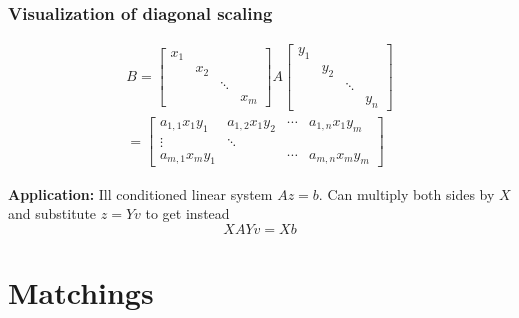 \documentclass{beamer}
\begin{document}
\begin{frame}
  \frametitle{Visualization of diagonal scaling}

  \begin{equation}
    \begin{aligned}
    B = \begin{bmatrix}
      x_1 & & & \\
      & x_2 & & \\
      & & \ddots & \\
      & & & x_m
    \end{bmatrix}
    A
    \begin{bmatrix}
      y_1 & & & \\
      & y_2 & & \\
      & & \ddots & \\
      & & & y_n
    \end{bmatrix}
    \\
    =
    \begin{bmatrix}
      a_{1,1}x_1y_1 & a_{1,2}x_1y_2 & \cdots & a_{1,n} x_1y_m \\
      \vdots   & \ddots & & \\
      a_{m,1}x_m y_1 & & \cdots & a_{m,n}x_m y_m
    \end{bmatrix}
    \end{aligned}
  \end{equation}
  \begin{block}{\textbf{Application:} Ill conditioned linear system $Az = b$.}
    Can multiply both sides by $X$  and substitute $z= Yv$ to get instead
    \begin{equation}
      XAY v = X b
    \end{equation}
  \end{block}
\end{frame}

\section{Matchings}%
\label{sec:}
\end{document}
